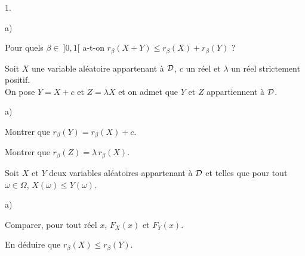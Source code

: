 \begin{noliste}{1.}
\begin{noliste}{a)}
    

    
    \item Pour quels $\beta \in \ ]0,1[$ a-t-on $r_{\beta}(X+Y) \leq
    r_\beta(X)+r_\beta(Y)$ ?
    
    
  \end{noliste}
  
  \item Soit $X$ une variable aléatoire appartenant à ${\cal D}$, 
  $c$ un réel et $\lambda$ un réel strictement positif.\\
  On pose $Y=X+c$ et $Z=\lambda X$ et on admet que $Y$ et $Z$ 
  appartiennent à ${\cal D}$.
  \begin{noliste}{a)}
    \setlength{\itemsep}{2mm}
    \item Montrer que $r_\beta(Y)=r_\beta(X)+c$.
    
    

    
    \item Montrer que $r_\beta(Z)=\lambda \, r_\beta(X)$.
    
    
  \end{noliste}
  
  \item Soit $X$ et $Y$ deux variables aléatoires appartenant à
  ${\cal D}$ et telles que pour tout $\omega \in \Omega$, 
  $X(\omega) \leq Y(\omega)$.
  \begin{noliste}{a)}
    \setlength{\itemsep}{2mm}
    \item Comparer, pour tout réel $x$, $F_X(x)$ et $F_Y(x)$.
    
    

    
    \item En déduire que $r_\beta(X) \leq r_\beta(Y)$. 
    
    
  \end{noliste}
\end{noliste}


\newpage


